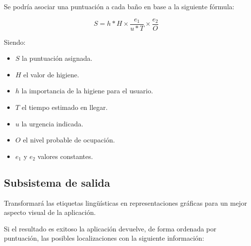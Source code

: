 \documentclass[13pt,a4paper]{article}
\begin{document}

Se podría asociar una puntuación a cada baño en base a la siguiente fórmula:

\begin{equation}
  S = h*H \times \frac{e_{1}}{u*T} \times \frac{e_{2}}{O}
\end{equation}

Siendo:
\begin{itemize}
  \item $S$ la puntuación asignada.
  \item $H$ el valor de higiene.
  \item $h$ la importancia de la higiene para el usuario.
  \item $T$ el tiempo estimado en llegar.
  \item $u$ la urgencia indicada.
  \item $O$ el nivel probable de ocupación.
  \item $e_{1}$ y $e_{2}$ valores constantes.
\end{itemize} 



\subsection{Subsistema de salida}


Transformará las etiquetas lingüísticas en representaciones gráficas para un mejor aspecto visual de la aplicación.

Si el resultado es exitoso la aplicación devuelve, de forma ordenada por puntuación, las posibles localizaciones con la siguiente información:
\end{document}
